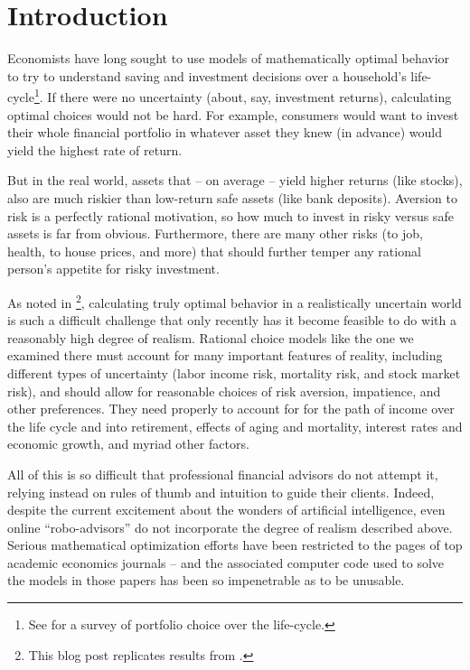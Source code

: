   \section{Introduction}

  Economists have long sought to use models of mathematically optimal behavior to try to understand saving and investment decisions over a household's life-cycle\footnote{See \cite{Gomes2020a} for a survey of portfolio choice over the life-cycle.}. If there were no uncertainty (about, say, investment returns), calculating optimal choices would not be  hard.  For example, consumers would want to invest their whole financial portfolio in whatever asset they knew (in advance) would yield the highest rate of return.

  But in the real world, assets that -- on average -- yield higher returns (like stocks), also are much riskier than low-return safe assets (like bank deposits).  Aversion to risk is a perfectly rational motivation, so how much to invest in risky versus safe assets is far from obvious.  Furthermore, there are many other risks (to  job,  health, to house prices, and more) that should further temper any rational person's appetite for risky investment.

  As noted in \cite{Carroll2020}\footnote{This blog post replicates results from \cite{Cocco2005}.}, calculating truly optimal behavior in a realistically uncertain world is such a difficult challenge that only recently has it become feasible to do with a reasonably high degree of realism.  Rational choice models like the one we examined there must account for many important features of reality, including different types of uncertainty (labor income risk, mortality risk, and stock market risk), and should allow for reasonable choices of risk aversion, impatience, and other preferences.  They need properly to account for for the path of income over the life cycle and into retirement, effects of aging and mortality, interest rates and economic growth, and myriad other factors.

  All of this is so difficult that professional financial advisors do not attempt it, relying instead on rules of thumb and intuition to guide their clients.
  Indeed, despite the current excitement about the wonders of artificial intelligence, even  online ``robo-advisors'' do not incorporate the degree of realism described above.  Serious mathematical optimization efforts have been restricted to the pages of top academic economics journals -- and the associated computer code used to solve the models in those papers has been so impenetrable as to be unusable.

